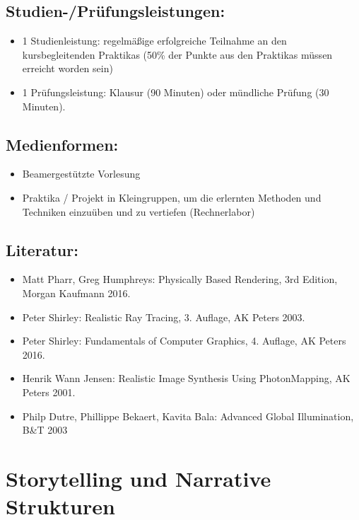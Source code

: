 \section*{Studien-/Prüfungsleistungen:}\label{studien-pruxfcfungsleistungen-16}

\begin{itemize}
\tightlist
\item
  1 Studienleistung: regelmäßige erfolgreiche Teilnahme an den
  kursbegleitenden Praktikas (50\% der Punkte aus den Praktikas müssen
  erreicht worden sein)
\item
  1 Prüfungsleistung: Klausur (90 Minuten) oder mündliche Prüfung (30
  Minuten).
\end{itemize}

\section*{Medienformen:}\label{medienformen-16}

\begin{itemize}
\tightlist
\item
  Beamergestützte Vorlesung
\item
  Praktika / Projekt in Kleingruppen, um die erlernten Methoden und
  Techniken einzuüben und zu vertiefen (Rechnerlabor)
\end{itemize}

\section*{Literatur:}\label{literatur-16}

\begin{itemize}
\tightlist
\item
  Matt Pharr, Greg Humphreys: Physically Based Rendering, 3rd Edition,
  Morgan Kaufmann 2016.
\item
  Peter Shirley: Realistic Ray Tracing, 3. Auflage, AK Peters 2003.
\item
  Peter Shirley: Fundamentals of Computer Graphics, 4. Auflage, AK
  Peters 2016.
\item
  Henrik Wann Jensen: Realistic Image Synthesis Using PhotonMapping, AK
  Peters 2001.
\item
  Philp Dutre, Phillippe Bekaert, Kavita Bala: Advanced Global
  Illumination, B\&T 2003
\end{itemize}

\chapter{Storytelling und Narrative
Strukturen}\label{storytelling-und-narrative-strukturen}

